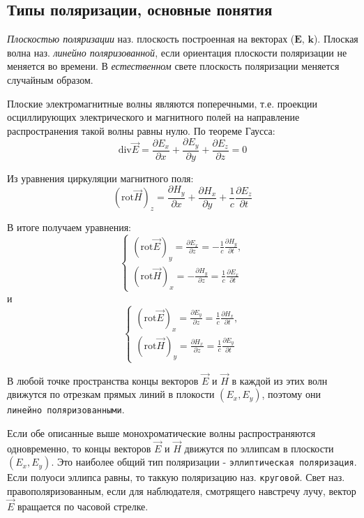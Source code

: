 \documentclass[a4paper,12pt]{article}
\begin{document}
\subsection{Типы поляризации, основные понятия}
\textit{Плоскостью поляризации} наз. плоскость построенная на векторах ($\mathbf{E}$, $\mathbf{k}$). Плоская волна наз. \textit{линейно поляризованной}, если ориентация плоскости поляризации не меняется во времени. В \textit{естественном} свете плоскость поляризации меняется случайным образом.

Плоские электромагнитные волны являются поперечными, т.е. проекции осциллирующих электрического и магнитного полей на направление распространения такой волны равны нулю. По теореме Гаусса:
$$
\text{div}\vec{E}=\frac{\partial E_x}{\partial x}+\frac{\partial E_y}{\partial y}+\frac{\partial E_z}{\partial z}=0
$$

Из уравнения циркуляции магнитного поля:
$$
(\text{rot}\vec{H})_z=\frac{\partial H_y}{\partial x}+\frac{\partial H_x}{\partial y}+\frac{1}{c}\frac{\partial E_z}{\partial t}
$$

В итоге получаем уравнения:
$$
\left\{ 
\begin{array}{ll} 
(\text{rot}\vec{E})_y=\frac{\partial E_x}{\partial z}=-\frac{1}{c}\frac{\partial H_y}{\partial t}, \\
(\text{rot}\vec{H})_x=-\frac{\partial H_y}{\partial z}=\frac{1}{c}\frac{\partial E_x}{\partial t}\end{array}\right.
$$
и
$$
\left\{ 
\begin{array}{ll} 
(\text{rot}\vec{E})_x=\frac{\partial E_y}{\partial z}=\frac{1}{c}\frac{\partial H_x}{\partial t}, \\
(\text{rot}\vec{H})_y=\frac{\partial H_x}{\partial z}=\frac{1}{c}\frac{\partial E_y}{\partial t}\end{array}\right.
$$

В любой точке пространства концы векторов $\vec{E}$ и $\vec{H}$ в каждой из этих волн движутся по отрезкам прямых линий в плокости $(E_x, E_y)$, поэтому они \texttt{линейно поляризованными}.

Если обе описанные выше монохроматические волны распространяются одновременно, то концы векторов $\vec{E}$ и $\vec{H}$ движутся по эллипсам в плоскости $(E_x, E_y)$. Это наиболее общий тип поляризации - \texttt{эллиптическая поляризация}. Если полуоси эллипса равны, то таккую поляризацию наз. \texttt{круговой}. Свет наз. правополяризованным, если для наблюдателя, смотрящего навстречу лучу, вектор $\vec{E}$ вращается по часовой стрелке. 
\end{document}
